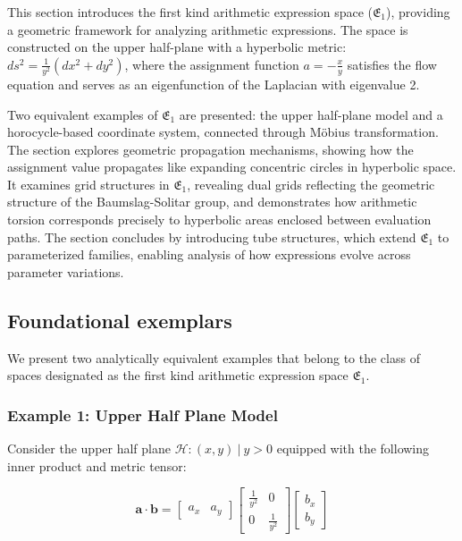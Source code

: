 This section introduces the first kind arithmetic expression space ($\mathfrak{E}_1$), providing a geometric framework for analyzing arithmetic expressions. The space is constructed on the upper half-plane with a hyperbolic metric: $ds^2 = \frac{1}{y^2} (dx^2 + dy^2)$, where the assignment function $a = - \frac{x}{y}$ satisfies the flow equation and serves as an eigenfunction of the Laplacian with eigenvalue 2.

Two equivalent examples of $\mathfrak{E}_1$ are presented: the upper half-plane model and a horocycle-based coordinate system, connected through Möbius transformation. The section explores geometric propagation mechanisms, showing how the assignment value propagates like expanding concentric circles in hyperbolic space. It examines grid structures in $\mathfrak{E}_1$, revealing dual grids reflecting the geometric structure of the Baumslag-Solitar group, and demonstrates how arithmetic torsion corresponds precisely to hyperbolic areas enclosed between evaluation paths. The section concludes by introducing tube structures, which extend $\mathfrak{E}_1$ to parameterized families, enabling analysis of how expressions evolve across parameter variations.

\subsection{Foundational exemplars}\label{subsec:motivexamples}

We present two analytically equivalent examples that belong to the class of spaces designated as the first kind arithmetic expression space $\mathfrak{E}_1$.

\subsubsection{Example 1: Upper Half Plane Model}

Consider the upper half plane ${\mathcal{H}: (x, y) \ | \ y > 0}$ equipped with the following inner product and metric tensor:

$$
\mathbf{a} \cdot \mathbf{b} = \begin{bmatrix} a_x & a_y \end{bmatrix} \begin{bmatrix} \frac{1}{y^2} & 0 \\ 0 & \frac{1}{y^2} \end{bmatrix} \begin{bmatrix} b_x \\ b_y \end{bmatrix}
$$

